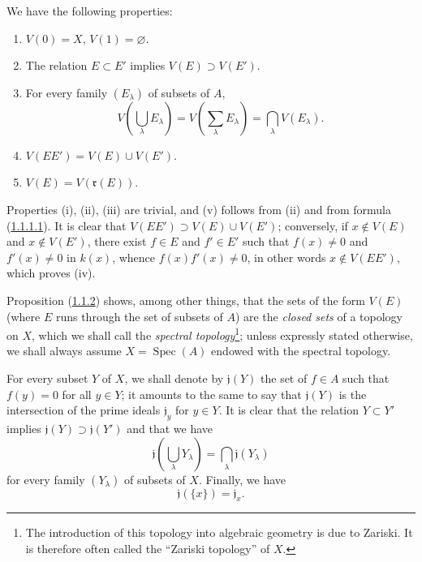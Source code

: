 \begin{proposition}[1.1.2]
\label{I.1.1.2}
We have the following properties:
\begin{enumerate}
  \item[\rm(i)] $V(0)=X$, $V(1)=\varnothing$.
  \item[\rm(ii)] The relation $E\subset E'$ implies $V(E)\supset V(E')$.
  \item[\rm(iii)] For every family $(E_\lambda)$ of subsets of $A$,
  \[
    V\left(\bigcup_\lambda E_\lambda\right)
      =V\left(\sum_\lambda E_\lambda\right)
      =\bigcap_\lambda V(E_\lambda).
  \]
  \item[\rm(iv)] $V(EE')=V(E)\cup V(E')$.
  \item[\rm(v)] $V(E)=V(\mathfrak{r}(E))$.
\end{enumerate}
\end{proposition}

Properties (i), (ii), (iii) are trivial, and (v) follows from (ii) and from
formula (\hyperref[I.1.1.1.1]{1.1.1.1}). It is clear that
$V(EE')\supset V(E)\cup V(E')$; conversely, if $x\notin V(E)$ and
$x\notin V(E')$, there exist $f\in E$ and $f'\in E'$ such that $f(x)\neq0$
and $f'(x)\neq0$ in $k(x)$, whence $f(x)f'(x)\neq0$, in other words
$x\notin V(EE')$, which proves (iv).

Proposition (\hyperref[I.1.1.2]{1.1.2}) shows, among other things, that
the sets of the form $V(E)$ (where $E$ runs through the set of subsets of $A$)
are the \emph{closed sets} of a topology on $X$, which we shall call the
\emph{spectral topology}\footnote{The introduction of this topology into
algebraic geometry is due to Zariski. It is therefore often called the
``Zariski topology'' of $X$.}; unless expressly stated otherwise, we shall
always assume $X=\operatorname{Spec}(A)$ endowed with the spectral topology.

\begin{env}[1.1.3]
\label{I.1.1.3}
For every subset $Y$ of $X$, we shall denote by $\mathfrak{j}(Y)$
the set of $f\in A$ such that $f(y)=0$ for all $y\in Y$; it amounts to the
same to say that $\mathfrak{j}(Y)$ is the intersection of the prime ideals
$\mathfrak{j}_y$ for $y\in Y$. It is clear that the relation $Y\subset Y'$
implies $\mathfrak{j}(Y)\supset\mathfrak{j}(Y')$ and that we have
\begin{equation}
  \mathfrak{j}\left(\bigcup_\lambda Y_\lambda\right)
    =\bigcap_\lambda\mathfrak{j}(Y_\lambda)
  \tag{1.1.3.1}\label{I.1.1.3.1}
\end{equation}
for every family $(Y_\lambda)$ of subsets of $X$. Finally, we have
\begin{equation}
  \mathfrak{j}(\{x\})=\mathfrak{j}_x.
  \tag{1.1.3.2}\label{I.1.1.3.2}
\end{equation}
\end{env}


